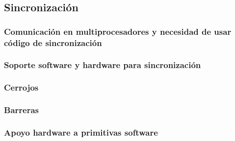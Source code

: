 \documentclass[12pt,spanish]{article}
\begin{document}
\subsection{Sincronización}


\subsubsection{Comunicación en multiprocesadores y necesidad de usar código de sincronización}



\subsubsection{Soporte software y hardware para sincronización}



\subsubsection{Cerrojos}



\subsubsection{Barreras}



\subsubsection{Apoyo hardware a primitivas software}
\end{document}

